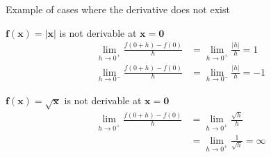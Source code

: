 \documentclass[9pt]{beamer}
\begin{document}

    

\begin{frame}{Example of cases where the derivative does not exist}

    \begin{block}{$\pmb{f(x) = |x|}$ is not derivable at $\pmb{x = 0}$}
        \begin{align*}
            \lim_{h\rightarrow 0^+}\frac{f(0 + h) - f(0)}{h} & =
            \lim_{h\rightarrow 0^+}\frac{|h|}{h} = 1 \\
            \lim_{h\rightarrow 0^-}\frac{f(0 + h) - f(0)}{h} & =
            \lim_{h\rightarrow 0^-}\frac{|h|}{h} = -1
        \end{align*}
    \end{block}

    \begin{block}{$\pmb{f(x) = \sqrt{x}}$ is not derivable at $\pmb{x = 0}$}
        \begin{align*}
            \lim_{h\rightarrow 0^+}\frac{f(0 + h) - f(0)}{h} & =
            \lim_{h\rightarrow 0^+}\frac{ \sqrt{h}}{h} \\
            &= \lim_{h\rightarrow 0^+}\frac{1}{\sqrt{h}} = \infty
        \end{align*}
    \end{block}
    
\end{frame}
\end{document}

